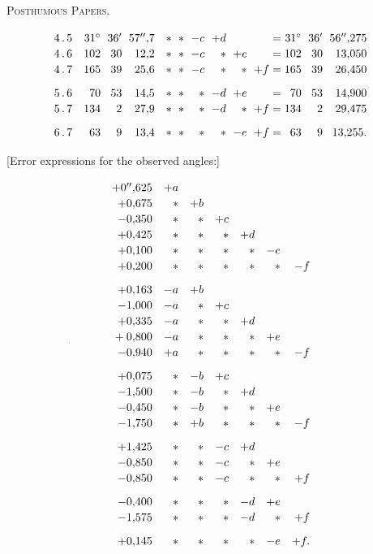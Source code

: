 \begingroup
\clearpage
{}\hfill\textsc{Posthumous Papers.}\hfill\mbox{}\par\medskip
\[
\setlength{\arraycolsep}{3pt}
\begin{array}{c@{\quad}rrr@{\quad}rrrrrr@{\;}c@{\;}rrr}
4\,.\,5&31^\circ&36'&57''{,}7&\ast&\ast&-c&+d&&&=&31^\circ&36'&56''{,}275\\
4\,.\,6&102&30&12{,}2&\ast&\ast&-c&\ast&+e&&=&102&30&13{,}050\\
4\,.\,7&165&39&25{,}6&\ast&\ast&-c&\ast&\ast&+f&=&165&39&26{,}450\\[7pt]
5\,.\,6&70&53&14{,}5&\ast&\ast&\ast&-d&+e&&=&70&53&14{,}900\\
5\,.\,7&134&2&27{,}9&\ast&\ast&\ast&-d&\ast&+f&=&134&2&29{,}475\\[7pt]
6\,.\,7&63&9&13{,}4&\ast&\ast&\ast&\ast&-e&+f&=&63&9&13{,}255.
\end{array}
\]
\begin{center}[Error expressions for the observed angles:]\end{center}
\[
\renewcommand{\arraystretch}{1.15}
\begin{array}{rrrrrrr}
+0''{,}625&+a&&&&&\\
+0{,}675&\ast&+b&&&&\\
-0{,}350&\ast&\ast&+c&&&\\
+0{,}425&\ast&\ast&\ast&+d&&\\
+0{,}100&\ast&\ast&\ast&\ast&-e&\\
+0{,}200&\ast&\ast&\ast&\ast&\ast&-f\\[7pt]
+0{,}163&-a&+b&&&&\\
-1{,}000&-a&\ast&+c&&&\\
+0{,}335&-a&\ast&\ast&+d&&\\
\llap{\raisebox{-.6ex}{\text{\tiny.}}\hspace{1.3cm}}+0{,}800&-a&\ast&\ast&\ast&+e&\\
-0{,}940&+a&\ast&\ast&\ast&\ast&-f\\[7pt]
+0{,}075&\ast&-b&+c&&&\\
-1{,}500&\ast&-b&\ast&+d&&\\
-0{,}450&\ast&-b&\ast&\ast&+e&\\
-1{,}750&\ast&+b&\ast&\ast&\ast&-f\\[7pt]
+1{,}425&\ast&\ast&-c&+d&&\\
-0{,}850&\ast&\ast&-c&\ast&+e&\\
-0{,}850&\ast&\ast&-c&\ast&\ast&+f\\[7pt]
-0{,}400&\ast&\ast&\ast&-d&+e&\\
-1{,}575&\ast&\ast&\ast&-d&\ast&+f\\[7pt]
+0{,}145&\ast&\ast&\ast&\ast&-e&+f.
\end{array}
\]


